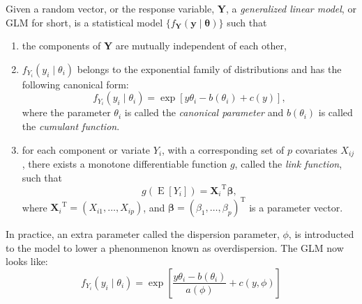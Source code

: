 \documentclass[12pt]{article}
\begin{document}

Given a random vector, or the response variable, \textbf{Y}, a \emph{generalized linear model}, or GLM for short, is a statistical model $\lbrace f_\textbf{Y}(\boldsymbol{y}\mid\boldsymbol{\theta})\rbrace$ such that
\begin{enumerate}
\item the components of \textbf{Y} are mutually independent of each other,
\item $f_{Y_i}(y_i\mid\theta_i)$ belongs to the exponential family of distributions and has the following canonical form:
$$f_{Y_i}(y_i\mid\theta_i)=\operatorname{exp}[y\theta_i-b(\theta_i)+c(y)],$$
where the parameter $\theta_i$ is called the \emph{canonical parameter} and $b(\theta_i)$ is called the \emph{cumulant function}.
\item for each component or variate $Y_i$, with a corresponding set of $p$ covariates $X_{ij}$, there exists a monotone differentiable function $g$, called the \emph{link function}, such that 
$$g(\operatorname{E}[Y_i])={\textbf{X}_i}^{\operatorname{T}}\boldsymbol{\beta},$$ 
where ${\textbf{X}_i}^{\operatorname{T}}=(X_{i1},\ldots,X_{ip})$, and $\boldsymbol{\beta}=(\beta_1,\ldots,\beta_p)^{\operatorname{T}}$ is a parameter vector.
\end{enumerate}

In practice, an extra parameter called the dispersion parameter, $\phi$, is introducted to the model to lower a phenonmenon known as overdispersion.  The GLM now looks like: $$f_{Y_i}(y_i\mid\theta_i)=\operatorname{exp}[\frac{y\theta_i-b(\theta_i)}{a(\phi)}+c(y,\phi)]$$
\end{document}
